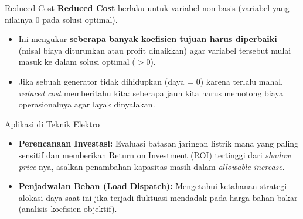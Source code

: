 \documentclass[aspectratio=169]{beamer}
\begin{document}
\begin{frame}{Reduced Cost}
    \textbf{Reduced Cost} berlaku untuk variabel non-basis (variabel yang nilainya 0 pada solusi optimal).
    \vspace{0.3cm}
    \begin{itemize}
        \item Ini mengukur \textbf{seberapa banyak koefisien tujuan harus diperbaiki} (misal biaya diturunkan atau profit dinaikkan) agar variabel tersebut mulai masuk ke dalam solusi optimal ($> 0$).
        \item Jika sebuah generator tidak dihidupkan (daya = 0) karena terlalu mahal, \textit{reduced cost} memberitahu kita: seberapa jauh kita harus memotong biaya operasionalnya agar layak dinyalakan.
    \end{itemize}
\end{frame}

\begin{frame}{Aplikasi di Teknik Elektro}
    \begin{itemize}
        \item \textbf{Perencanaan Investasi:} Evaluasi batasan jaringan listrik mana yang paling sensitif dan memberikan Return on Investment (ROI) tertinggi dari \textit{shadow price}-nya, asalkan penambahan kapasitas masih dalam \textit{allowable increase}.
        \item \textbf{Penjadwalan Beban (Load Dispatch):} Mengetahui ketahanan strategi alokasi daya saat ini jika terjadi fluktuasi mendadak pada harga bahan bakar (analisis koefisien objektif).
    \end{itemize}
\end{frame}
\end{document}
